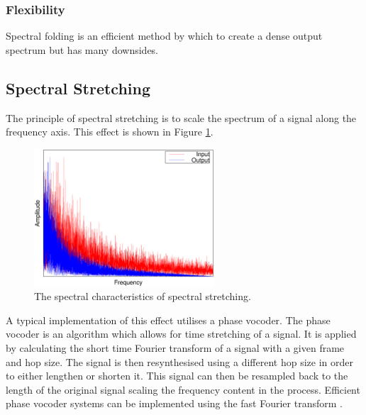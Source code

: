 		\subsubsection*{Flexibility}
			Spectral folding is an efficient method by which to create a dense output spectrum but has many
			downsides.


	\subsection{Spectral Stretching}
	\label{sec:Excitation-SpectralStretching}
		The principle of spectral stretching is to scale the spectrum of a signal along the frequency axis. This
		effect is shown in Figure \ref{fig:SpectralStretching}.

		\begin{figure}[h!]
			\centering
			\includegraphics[width=0.6\textwidth]{chapter3/Images/SpectralStretchingSpectrum.eps}
			\caption{The spectral characteristics of spectral stretching.}
			\label{fig:SpectralStretching}
		\end{figure}

		A typical implementation of this effect utilises a phase vocoder. The phase vocoder is an algorithm which
		allows for time stretching of a signal. It is applied by calculating the short time Fourier transform of a
		signal with a given frame and hop size. The signal is then resynthesised using a different hop size in
		order to either lengthen or shorten it. This signal can then be resampled back to the length of the
		original signal scaling the frequency content in the process. Efficient phase vocoder systems can be
		implemented using the fast Fourier transform \citep{portnoff1976implementation}.

